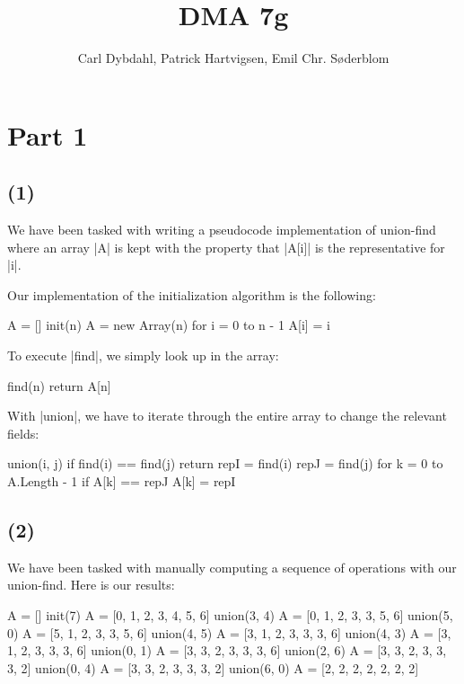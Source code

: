 \documentclass[a4paper]{article}
\title{DMA 7g}
\author{Carl Dybdahl, Patrick Hartvigsen, Emil Chr. Søderblom}
\begin{document}
\maketitle

\section*{Part 1}

\subsection*{(1)}

We have been tasked with writing a pseudocode implementation of union-find where an array \code|A| is kept with the property that \code|A[i]| is the representative for \code|i|.

Our implementation of the initialization algorithm is the following:

\begin{Code}
A = []
init(n)
    A = new Array(n)
    for i = 0 to n - 1
    	A[i] = i
\end{Code}

To execute \code|find|, we simply look up in the array:

\begin{Code}
find(n)
    return A[n]
\end{Code}

With \code|union|, we have to iterate through the entire array to change the relevant fields:

\begin{Code}
union(i, j)
	if find(i) == find(j)
		return
	repI = find(i)
	repJ = find(j)
	for k = 0 to A.Length - 1
		if A[k] == repJ
			A[k] = repI
\end{Code}

\subsection*{(2)}

We have been tasked with manually computing a sequence of operations with our union-find. Here is our results:

\begin{Code}
	A = []
init(7)
	A = [0, 1, 2, 3, 4, 5, 6]
union(3, 4)
	A = [0, 1, 2, 3, 3, 5, 6]
union(5, 0)
	A = [5, 1, 2, 3, 3, 5, 6]
union(4, 5)
	A = [3, 1, 2, 3, 3, 3, 6]
union(4, 3)
	A = [3, 1, 2, 3, 3, 3, 6]
union(0, 1)
	A = [3, 3, 2, 3, 3, 3, 6]
union(2, 6)
	A = [3, 3, 2, 3, 3, 3, 2]
union(0, 4)
	A = [3, 3, 2, 3, 3, 3, 2]
union(6, 0)
	A = [2, 2, 2, 2, 2, 2, 2]
\end{Code}
\end{document}
